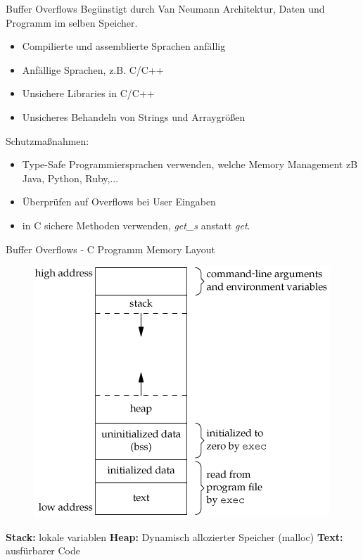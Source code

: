 \documentclass[10pt]{beamer}
\begin{document}
\begin{frame}[fragile]{Buffer Overflows}
  Beg\"unstigt durch Van Neumann Architektur, Daten und Programm im selben Speicher.
  \begin{itemize}
    \item Compilierte und assemblierte Sprachen anf\"allig
    \item Anf\"allige Sprachen, z.B. C/C++
    \item Unsichere Libraries in C/C++
    \item Unsicheres Behandeln von Strings und Arraygr\"o{\ss}en
  \end{itemize}

  Schutzma{\ss}nahmen:
  \begin{itemize}
    \item Type-Safe Programmiersprachen verwenden, welche Memory Management zB Java, Python, Ruby,...
    \item \"Uberpr\"ufen auf Overflows bei User Eingaben
    \item in C sichere Methoden verwenden, \textit{get\_s} anstatt \textit{get}.
  \end{itemize}
\end{frame}

\begin{frame}[fragile]{Buffer Overflows - C Programm Memory Layout}
  \begin{minipage}{0.5\textwidth}
    \begin{figure}[H]
      \includegraphics[scale=0.50]{memory_layout}
    \end{figure}
  \end{minipage} \hfill
  \begin{minipage}{0.3\textwidth}
    \textbf{Stack:} lokale variablen \newline \newline
    \textbf{Heap:} Dynamisch allozierter Speicher (malloc) \newline \newline
    \textbf{Text:} ausf\"urbarer Code \newline
  \end{minipage}
\end{frame}
\end{document}
